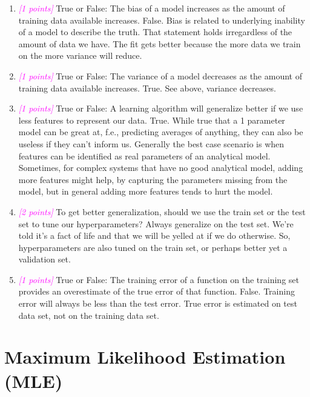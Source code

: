 \documentclass{article}
\newcommand{\1}{\mathbf{1}}
\newcommand{\points}[1]{\small\textcolor{magenta}{\emph{[#1 points]}} \normalsize}
\begin{document}
\begin{enumerate}
    \item\points{1} True or False:  The bias of a model increases as the amount of training data available increases.\newline
    False. Bias is related to underlying inability of a model to describe the truth. That statement holds irregardless of the amount of data we have. The fit gets better because the more data we train on the more variance will reduce.

    \item\points{1} True  or  False:  The  variance  of  a  model  decreases  as  the  amount  of  training  data  available increases.\newline
    True. See above, variance decreases.

    \item\points{1} True or False:  A learning algorithm will generalize better if we use less features to represent our data.\newline
    True. While true that a 1 parameter model can be great at, f.e., predicting averages of anything, they can also be useless if they can't inform us. Generally the best case scenario is when features can be identified as real parameters of an analytical model. Sometimes, for complex systems that have no good analytical model, adding more features might help, by capturing the parameters missing from the model, but in general adding more features tends to hurt the model.

    \item\points{2} To get better generalization, should we use the train set or the test set to tune our hyperparameters?\newline
    Always generalize on the test set. We're told it's a fact of life and that we will be yelled at if we do otherwise. So, hyperparameters are also tuned on the train set, or perhaps better yet a validation set. 

    \item\points{1} True or False:  The training error of a function on the training set provides an overestimate of the true error of that function. \newline
    False. Training error will always be less than the test error. True error is estimated on test data set, not on the training data set.
\end{enumerate}





\newpage
\section*{Maximum Likelihood Estimation (MLE)}
\end{document}
